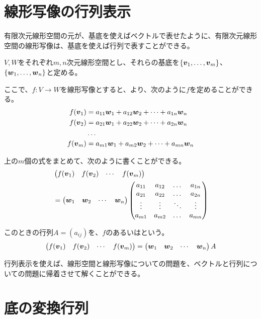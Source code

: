 \documentclass[../../../topic_linear-algebra]{subfiles}
\begin{document}
\sectionline
\section{線形写像の行列表示}

有限次元線形空間の元が、基底を使えばベクトルで表せたように、有限次元線形空間の線形写像は、基底を使えば行列で表すことができる。

\br

$V, W$をそれぞれ$m,n$次元線形空間とし、それらの基底を$\{ \vb*{v}_1, \ldots, \vb*{v}_m \}$、$\{ \vb*{w}_1, \ldots, \vb*{w}_n \}$と定める。

\br

ここで、$f\colon V \to W$を線形写像とすると、より、次のように$f$を定めることができる。
\begin{align*}
  f(\vb*{v}_1) &= a_{11}\vb*{w}_1 + a_{12}\vb*{w}_2 + \cdots + a_{1n}\vb*{w}_n \\
  f(\vb*{v}_2) &= a_{21}\vb*{w}_1 + a_{22}\vb*{w}_2 + \cdots + a_{2n}\vb*{w}_n \\
  & \ldots \\
  f(\vb*{v}_m) &= a_{m1}\vb*{w}_1 + a_{m2}\vb*{w}_2 + \cdots + a_{mn}\vb*{w}_n
\end{align*}

上の$m$個の式をまとめて、次のように書くことができる。
\begin{align*}
  &\begin{pmatrix}
    f(\vb*{v}_1) & f(\vb*{v}_2) & \cdots & f(\vb*{v}_m)
  \end{pmatrix} \\
  &= \begin{pmatrix}
    \vb*{w}_1 & \vb*{w}_2 & \cdots & \vb*{w}_n
  \end{pmatrix} \begin{pmatrix} 
  a_{11} & a_{12} & \dots  & a_{1n} \\
  a_{21} & a_{22} & \dots  & a_{2n} \\
  \vdots & \vdots & \ddots & \vdots \\
  a_{m1} & a_{m2} & \dots  & a_{mn}
\end{pmatrix} 
\end{align*}

このときの行列$A = (a_{ij})$を、$f$のあるいはという。
\begin{equation*}
  \begin{pmatrix}
    f(\vb*{v}_1) & f(\vb*{v}_2) & \cdots & f(\vb*{v}_m)
  \end{pmatrix} = \begin{pmatrix}
    \vb*{w}_1 & \vb*{w}_2 & \cdots & \vb*{w}_n
  \end{pmatrix} A
\end{equation*}

\br

行列表示を使えば、線形空間と線形写像についての問題を、ベクトルと行列についての問題に帰着させて解くことができる。

\sectionline
\section{底の変換行列}

\begin{mindflow}
  \todo{}
\end{mindflow}
\end{document}
